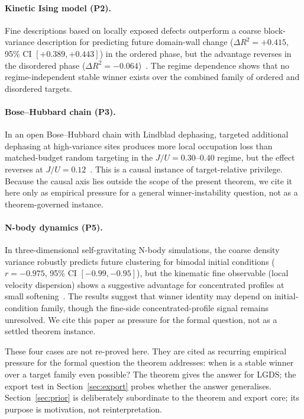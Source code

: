 \documentclass[11pt]{article}
\begin{document}
\paragraph{Kinetic Ising model (P2).}
Fine descriptions based on locally exposed defects outperform a coarse
block-variance description for predicting future domain-wall change
($\Delta R^2 = +0.415$, 95\% CI $[+0.389, +0.443]$) in the ordered phase,
but the advantage reverses in the disordered phase
($\Delta R^2 = -0.064$)~\citep{bhatia2026ising}.
The regime dependence shows that no regime-independent stable winner exists
over the combined family of ordered and disordered targets.

\paragraph{Bose--Hubbard chain (P3).}
In an open Bose--Hubbard chain with Lindblad dephasing,
targeted additional dephasing at high-variance sites produces more local
occupation loss than matched-budget random targeting in the
$J/U = 0.30$--$0.40$ regime, but the effect reverses at $J/U = 0.12$~\citep{bhatia2026bh}.
This is a causal instance of target-relative privilege.
Because the causal axis lies outside the scope of the present theorem,
we cite it here only as empirical pressure for a general winner-instability
question, not as a theorem-governed instance.

\paragraph{N-body dynamics (P5).}
In three-dimensional self-gravitating N-body simulations, the coarse density
variance robustly predicts future clustering for bimodal initial conditions
($r = -0.975$, 95\% CI $[-0.99, -0.95]$), but the kinematic fine observable
(local velocity dispersion) shows a suggestive advantage for concentrated
profiles at small softening~\citep{bhatia2026nbody}.
The results suggest that winner identity may depend on initial-condition
family, though the fine-side concentrated-profile signal remains unresolved.
We cite this paper as pressure for the formal question, not as a settled
theorem instance.

These four cases are not re-proved here.
They are cited as recurring empirical pressure for the formal question the
theorem addresses: when is a stable winner over a target family even possible?
The theorem gives the answer for LGDS;
the export test in Section~\ref{sec:export} probes whether the answer
generalises.
Section~\ref{sec:prior} is deliberately subordinate to the theorem and
export core; its purpose is motivation, not reinterpretation.
\end{document}
